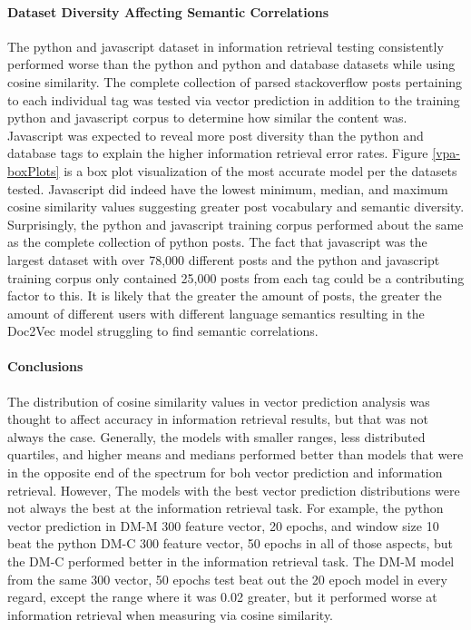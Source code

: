 \paragraph{Dataset Diversity Affecting Semantic Correlations}
The python and javascript dataset in information retrieval testing consistently performed worse than the python and python and database datasets while using cosine similarity. The complete collection of parsed stackoverflow posts pertaining to each individual tag was tested via vector prediction in addition to the training python and javascript corpus to determine how similar the content was. Javascript was expected to reveal more post diversity than the python and database tags to explain the higher information retrieval error rates. Figure \ref{vpa-boxPlots} is a box plot visualization of the most accurate model per the datasets tested. Javascript did indeed have the lowest minimum, median, and maximum cosine similarity values suggesting greater post vocabulary and semantic diversity. Surprisingly, the python and javascript training corpus performed about the same as the complete collection of python posts. The fact that javascript was the largest dataset with over 78,000 different posts and the python and javascript training corpus only contained 25,000 posts from each tag could be a contributing factor to this. It is likely that the greater the amount of posts, the greater the amount of different users with different language semantics resulting in the Doc2Vec model struggling to find semantic correlations.

\paragraph{Conclusions}
The distribution of cosine similarity values in vector prediction analysis was thought to affect accuracy in information retrieval results, but that was not always the case. Generally, the models with smaller ranges, less distributed quartiles, and higher means and medians performed better than models that were in the opposite end of the spectrum for boh vector prediction and information retrieval. However, The models with the best vector prediction distributions were not always the best at the information retrieval task. For example, the python vector prediction in DM-M 300 feature vector, 20 epochs, and window size 10 beat the python DM-C 300 feature vector, 50 epochs in all of those aspects, but the DM-C performed better in the information retrieval task. The DM-M model from the same 300 vector, 50 epochs test beat out the 20 epoch model in every regard, except the range where it was 0.02 greater, but it performed worse at information retrieval when measuring via cosine similarity.

